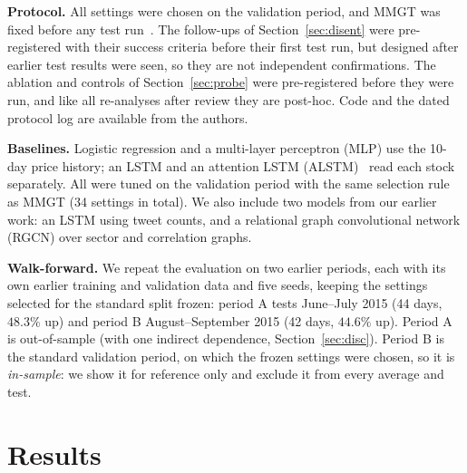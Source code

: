 \documentclass[conference]{IEEEtran}
\begin{document}
\textbf{Protocol.} All settings were chosen on the validation period, and MMGT was
fixed before any test run~\cite{nosek2018}. The follow-ups of
Section~\ref{sec:disent} were pre-registered with their success criteria before
their first test run, but designed after earlier test results were seen, so they are
not independent confirmations. The ablation and controls of Section~\ref{sec:probe}
were pre-registered before they were run, and like all re-analyses after review they
are post-hoc. Code and the dated protocol log are available from the authors.

\textbf{Baselines.} Logistic regression and a multi-layer perceptron (MLP) use the
10-day price history; an LSTM and an attention LSTM (ALSTM)~\cite{feng2019advalstm}
read each stock separately. All were tuned on the validation period with the same
selection rule as MMGT (34 settings in total). We also include two models from our
earlier work: an LSTM using tweet counts, and a relational graph convolutional
network (RGCN) over sector and correlation graphs.

\textbf{Walk-forward.} We repeat the evaluation on two earlier periods, each with
its own earlier training and validation data and five seeds, keeping the settings
selected for the standard split frozen: period A tests June--July 2015 (44 days,
$48.3\%$ up) and period B August--September 2015 (42 days, $44.6\%$ up). Period A is
out-of-sample (with one indirect dependence, Section~\ref{sec:disc}). Period B is the
standard validation period, on which the frozen settings were chosen, so it is
\emph{in-sample}: we show it for reference only and exclude it from every average and
test.

\section{Results}
\end{document}
